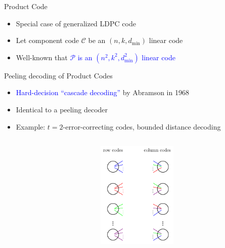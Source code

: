 \documentclass[10pt,xcolor=table]{beamer}
\begin{document}
\begin{frame}{Product Code}
\begin{itemize}
\item Special case of generalized LDPC code
\item Let component code $\mathcal{C}$ be an $(n,k,d_{\text{min}})$ linear code
\item Well-known that \textcolor{blue}{$\mathcal{P}$ is an $(n^{2},k^{2},d_{\text{min}}^{2})$
linear code }
\end{itemize}

\begin{center}
\scalebox{0.8}{}
\end{center}
\end{frame}

\begin{frame}{\alert{Peeling} decoding of Product Codes}

\begin{itemize}
\item \textcolor{blue}{Hard-decision ``cascade decoding''} by Abramson in 1968
\item Identical to a \alert{peeling decoder}
\item Example: $t=2$-error-correcting codes, bounded distance decoding
\end{itemize}

\begin{columns}
\begin{column}{0.5\textwidth}
\scalebox{1.4}{}
\end{column}

\begin{column}{0.5\textwidth}
\begin{figure}[t]
\centering
\includegraphics[width=1.5in]{./Figures/Bipartite_graph}
\end{figure}
\end{column}
\end{columns}
\end{frame}
\end{document}
